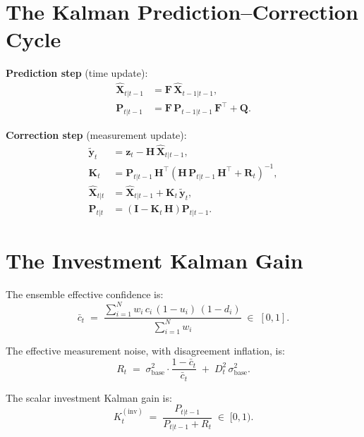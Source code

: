 \documentclass[12pt,openany]{book}
\numberwithin{equation}{chapter}
\theoremstyle{plain}
\theoremstyle{definition}
\theoremstyle{remark}
\begin{document}
\section{The Kalman Prediction--Correction Cycle}

\textbf{Prediction step} (time update):
\begin{align}
  \hat{\mathbf{X}}_{t|t-1} &= \mathbf{F}\,\hat{\mathbf{X}}_{t-1|t-1}, \\
  \mathbf{P}_{t|t-1} &= \mathbf{F}\,\mathbf{P}_{t-1|t-1}\,\mathbf{F}^\top + \mathbf{Q}.
\end{align}

\textbf{Correction step} (measurement update):
\begin{align}
  \tilde{\mathbf{y}}_t &= \mathbf{z}_t - \mathbf{H}\,\hat{\mathbf{X}}_{t|t-1}, \\
  \mathbf{K}_t &= \mathbf{P}_{t|t-1}\,\mathbf{H}^\top
    \!\left(\mathbf{H}\,\mathbf{P}_{t|t-1}\,\mathbf{H}^\top + \mathbf{R}_t\right)^{-1}, \\
  \hat{\mathbf{X}}_{t|t} &= \hat{\mathbf{X}}_{t|t-1} + \mathbf{K}_t\,\tilde{\mathbf{y}}_t, \\
  \mathbf{P}_{t|t} &= \left(\mathbf{I} - \mathbf{K}_t\,\mathbf{H}\right)\mathbf{P}_{t|t-1}.
\end{align}

\section{The Investment Kalman Gain}

The ensemble effective confidence is:
\begin{equation}
  \bar{c}_t \;=\;
  \frac{\displaystyle\sum_{i=1}^{N} w_i\,c_i\,(1-u_i)\,(1-d_i)}
       {\displaystyle\sum_{i=1}^{N} w_i}
  \;\in\; [0,1].
  \label{eq:effective-confidence}
\end{equation}

The effective measurement noise, with disagreement inflation, is:
\begin{equation}
  R_t \;=\;
  \sigma_{\mathrm{base}}^2\!\cdot\!\frac{1-\bar{c}_t}{\bar{c}_t}
  \;+\;
  D_t^2\,\sigma_{\mathrm{base}}^2.
  \label{eq:effective-noise}
\end{equation}

The scalar investment Kalman gain is:
\begin{equation}
  K_t^{(\mathrm{inv})} \;=\;
  \frac{P_{t|t-1}}{P_{t|t-1} + R_t}
  \;\in\; [0,1).
  \label{eq:investment-gain}
\end{equation}
\end{document}
